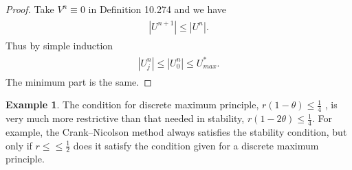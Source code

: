 \documentclass[a4paper,twoside]{ctexart}
\theoremstyle{definition}
\newtheorem{example}[definition]{Example}
\begin{document}
\begin{proof}
	Take $V^n \equiv 0$ in Definition 10.274 and we have
	\begin{eqnarray}
	\begin{aligned}
	|U^{n+1}| \le |U^n|.
	\end{aligned}
	\end{eqnarray}
	Thus by simple induction
	\begin{eqnarray}
	\begin{aligned}
	|U^n_j| \le |U^n_0| \le U_{max}^*.
	\end{aligned}
	\end{eqnarray}
	The minimum part is the same.
\end{proof}
\begin{example}
	The condition for discrete maximum principle, $r(1 − \theta) \le \frac{1}{4}$ , is very much more
	restrictive than that needed in stability, $r(1 −
	2\theta) \le \frac{1}{4}$. For example, the Crank–Nicolson method always satisfies the
	stability condition, but only if $r ≤\le \frac{1}{2}$ does it satisfy the condition given for a discrete maximum principle.
\end{example}
\end{document}
